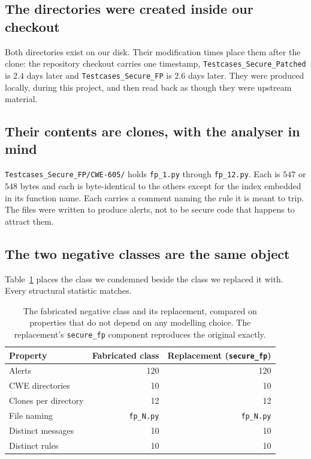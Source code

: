 \documentclass[journal]{IEEEtran}
\theoremstyle{definition}
\newcommand{\CFpSecure}{120}
\begin{document}
\subsection{The directories were created inside our checkout}

Both directories exist on our disk. Their modification times place them after
the clone: the repository checkout carries one timestamp,
\texttt{Testcases\_\allowbreak{}Secure\_\allowbreak{}Patched} is \(2.4\) days later and
\texttt{Testcases\_\allowbreak{}Secure\_\allowbreak{}FP} is \(2.6\) days later. They were produced locally,
during this project, and then read back as though they were upstream material.

\subsection{Their contents are clones, with the analyser in mind}

\texttt{Testcases\_\allowbreak{}Secure\_\allowbreak{}FP/\allowbreak{}CWE-\allowbreak{}605/} holds \texttt{fp\_1.py} through
\texttt{fp\_12.py}. Each is \(547\) or \(548\) bytes and each is byte-identical
to the others except for the index embedded in its function name. Each carries a
comment naming the rule it is meant to trip. The files were written to produce
alerts, not to be secure code that happens to attract them.

\subsection{The two negative classes are the same object}

Table~\ref{tab:twoclasses} places the class we condemned beside the class we
replaced it with. Every structural statistic matches.

\begin{table}[t]
\caption{The fabricated negative class and its replacement, compared on
properties that do not depend on any modelling choice. The replacement's
\texttt{secure\_fp} component reproduces the original exactly.}
\label{tab:twoclasses}
\centering
\footnotesize
\setlength{\tabcolsep}{5pt}
\begin{tabular}{@{}lrr@{}}
\toprule
Property & Fabricated class & Replacement (\texttt{secure\_fp}) \\
\midrule
Alerts & 120 & \CFpSecure \\
CWE directories & 10 & 10 \\
Clones per directory & 12 & 12 \\
File naming & \texttt{fp\_N.py} & \texttt{fp\_N.py} \\
Distinct messages & 10 & 10 \\
Distinct rules & 10 & 10 \\
\bottomrule
\end{tabular}
\end{table}
\end{document}
